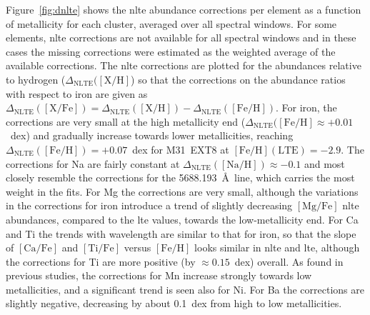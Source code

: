 \documentclass{aa}
\begin{document}
Figure~\ref{fig:dnlte} shows the \ac{nlte} abundance corrections per element as a function of metallicity for each cluster, averaged over all spectral windows. For some elements, \ac{nlte} corrections are not available for all spectral windows and in these cases the missing corrections were estimated as the weighted average of the available corrections.
The \ac{nlte} corrections are plotted for the abundances relative to hydrogen ($\Delta_\mathrm{NLTE}(\mathrm{[X/H]}$) so that the corrections on the abundance ratios with respect to iron are given as
$\Delta_\mathrm{NLTE}(\mathrm{[X/Fe]}) = \Delta_\mathrm{NLTE}(\mathrm{[X/H]}) - \Delta_\mathrm{NLTE}(\mathrm{[Fe/H]})$.
For iron, the corrections are very small at the high metallicity end ($\Delta_\mathrm{NLTE}(\mathrm{[Fe/H]}\approx+0.01$~dex) and gradually increase towards lower metallicities, reaching $\Delta_\mathrm{NLTE}(\mathrm{[Fe/H]})=+0.07$~dex for M31~EXT8 at $\mathrm{[Fe/H]}(\mathrm{LTE})=-2.9$. The corrections for Na are fairly constant at $\Delta_\mathrm{NLTE}(\mathrm{[Na/H]})\approx-0.1$ and most closely resemble the corrections for the 5688.193~\AA\ line, which carries the most weight in the fits. 
For Mg the corrections are very small, although the variations in the corrections for iron introduce a trend of slightly decreasing $\mathrm{[Mg/Fe]}$ \ac{nlte} abundances, compared to the \ac{lte} values, towards the low-metallicity end. For Ca and Ti the trends with wavelength are similar to that for iron, so that the slope of $\mathrm{[Ca/Fe]}$ and $\mathrm{[Ti/Fe]}$ versus $\mathrm{[Fe/H]}$  looks similar in \ac{nlte} and \ac{lte}, although the corrections for Ti are more positive (by $\approx0.15$~dex) overall. As found in previous studies, the corrections for Mn increase strongly towards low metallicities, and a significant trend is seen also for Ni. For Ba the corrections are slightly negative, decreasing by about 0.1~dex from high to low metallicities. 
\end{document}
